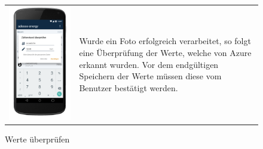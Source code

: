 \begin{figure}[h]
\begin{tabularx}{\textwidth}{X  X}
	\includegraphics[scale = 0.155]{img/AndroidMockup/check} \caption{Werte überprüfen} & Wurde ein Foto erfolgreich verarbeitet, so folgt eine Überprüfung der Werte, welche von Azure erkannt wurden. Vor dem endgültigen Speichern der Werte müssen diese vom Benutzer bestätigt werden. \\ 
\end{tabularx}
\end{figure}

